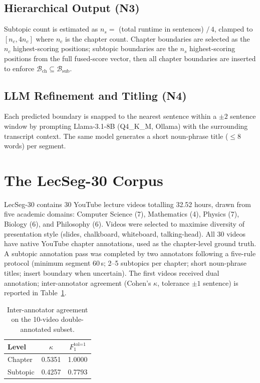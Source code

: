 \documentclass[conference]{IEEEtran}
\newcommand{\dataset}{LecSeg-30}
\begin{document}
\subsection{Hierarchical Output (N3)}

Subtopic count is estimated as $n_s = $ (total runtime in sentences) $/\, 4$,
clamped to $[n_c, 4 n_c]$ where $n_c$ is the chapter count. Chapter boundaries
are selected as the $n_c$ highest-scoring positions; subtopic boundaries are
the $n_s$ highest-scoring positions from the full fused-score vector, then
all chapter boundaries are inserted to enforce
$\mathcal{B}_\text{ch} \subseteq \mathcal{B}_\text{sub}$.

\subsection{LLM Refinement and Titling (N4)}

Each predicted boundary is snapped to the nearest sentence within a $\pm 2$
sentence window by prompting Llama-3.1-8B (Q4\_K\_M, Ollama) with the
surrounding transcript context. The same model generates a short noun-phrase
title ($\leq 8$ words) per segment.

\section{The \dataset{} Corpus}

\dataset{} contains 30 YouTube lecture videos totalling 32.52 hours, drawn from
five academic domains: Computer Science (7), Mathematics (4), Physics (7),
Biology (6), and Philosophy (6). Videos were selected to maximise
diversity of presentation style (slides, chalkboard, whiteboard, talking-head).
All 30 videos have native YouTube chapter annotations, used as the chapter-level
ground truth. A subtopic annotation pass was completed by two annotators
following a five-rule protocol (minimum segment 60\,s; 2--5 subtopics per
chapter; short noun-phrase titles; insert boundary when uncertain). The first
videos received dual annotation; inter-annotator agreement (Cohen's
$\kappa$, tolerance $\pm 1$ sentence) is reported in Table~\ref{tab:iaa}.

\begin{table}[t]
  \centering
  \caption{Inter-annotator agreement on the 10-video double-annotated subset.}
  \label{tab:iaa}
  \begin{tabular}{lcc}
    \toprule
    Level & $\kappa$ & $F_1^{\text{tol=1}}$ \\
    \midrule
    Chapter   & 0.5351 & 1.0000 \\
    Subtopic  & 0.4257 & 0.7793 \\
    \bottomrule
  \end{tabular}
\end{table}
\end{document}
